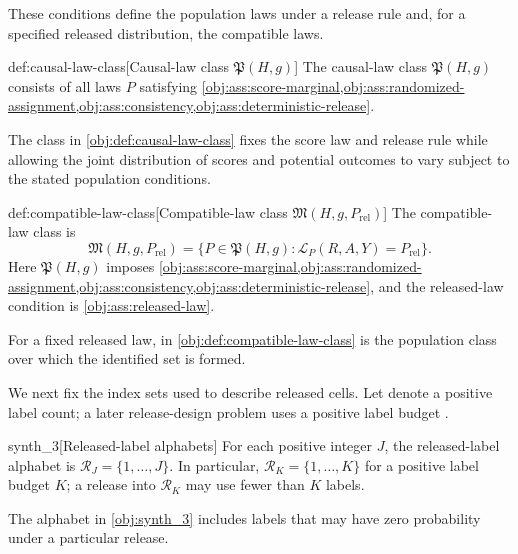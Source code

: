 \documentclass[11pt]{article}
\begin{document}
These conditions define the population laws under a release rule and, for a specified released distribution, the compatible laws.

\begin{definitionv}{def:causal-law-class}[Causal-law class \(\mathfrak P(H,g)\)]
The causal-law class \(\mathfrak P(H,g)\) consists of all laws \(P\) satisfying \cref{obj:ass:score-marginal,obj:ass:randomized-assignment,obj:ass:consistency,obj:ass:deterministic-release}.
\end{definitionv}

The class  in \cref{obj:def:causal-law-class} fixes the score law and release rule while allowing the joint distribution of scores and potential outcomes to vary subject to the stated population conditions.

\begin{definitionv}{def:compatible-law-class}[Compatible-law class \(\mathfrak M(H,g,P_{\mathrm{rel}})\)]
The compatible-law class is
\[
\mathfrak M(H,g,P_{\mathrm{rel}})
=
\bigl\{P\in\mathfrak P(H,g):\mathcal L_P(R,A,Y)=P_{\mathrm{rel}}\bigr\}.
\]
Here \(\mathfrak P(H,g)\) imposes \cref{obj:ass:score-marginal,obj:ass:randomized-assignment,obj:ass:consistency,obj:ass:deterministic-release}, and the released-law condition is \cref{obj:ass:released-law}.
\end{definitionv}

For a fixed released law,  in \cref{obj:def:compatible-law-class} is the population class over which the identified set is formed.

We next fix the index sets used to describe released cells. Let  denote a positive label count; a later release-design problem uses a positive label budget .

\begin{definitionv}{synth_3}[Released-label alphabets]
For each positive integer \(J\), the released-label alphabet is \(\mathcal R_J=\{1,\ldots,J\}\). In particular, \(\mathcal R_K=\{1,\ldots,K\}\) for a positive label budget \(K\); a release into \(\mathcal R_K\) may use fewer than \(K\) labels.
\end{definitionv}

The alphabet  in \cref{obj:synth_3} includes labels that may have zero probability under a particular release.
\end{document}
